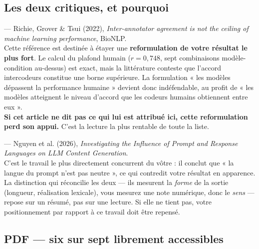 \documentclass[11pt,a4paper]{article}
\newcommand{\att}{\textcolor{warn}{\textbf{!}}}
\newcommand{\cle}[1]{\texttt{\small #1}}
\begin{document}
\subsection*{Les deux critiques, et pourquoi}

\begin{description}[leftmargin=0pt,style=unboxed]

\item[\att~\cle{richie\_etal22}] --- Richie, Grover \& Tsui (2022), \emph{Inter-annotator
agreement is not the ceiling of machine learning performance}, BioNLP.\\
Cette référence est destinée à étayer une \textbf{reformulation de votre
résultat le plus fort}. Le calcul du plafond humain ($r = 0{,}748$, sept
combinaisons modèle-condition au-dessus) est exact, mais la littérature conteste
que l'accord intercodeurs constitue une borne supérieure. La formulation
« les modèles dépassent la performance humaine » devient donc indéfendable, au
profit de « les modèles atteignent le niveau d'accord que les codeurs humains
obtiennent entre eux ».\\
\textbf{Si cet article ne dit pas ce qui lui est attribué ici, cette
reformulation perd son appui.} C'est la lecture la plus rentable de toute la
liste.

\item[\att~\cle{nguyen\_etal26}] --- Nguyen et al. (2026), \emph{Investigating the
Influence of Prompt and Response Languages on LLM Content Generation}.\\
C'est le travail le plus directement concurrent du vôtre : il conclut que « la
langue du prompt n'est pas neutre », ce qui contredit votre résultat en
apparence. La distinction qui réconcilie les deux --- ils mesurent la
\emph{forme} de la sortie (longueur, réalisation lexicale), vous mesurez une
note numérique, donc le \emph{sens} --- repose sur un résumé, pas sur une
lecture. Si elle ne tient pas, votre positionnement par rapport à ce travail
doit être repensé.

\end{description}

\subsection*{PDF --- six sur sept librement accessibles}
\end{document}
